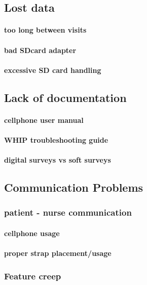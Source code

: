 \subsection {Lost data}
\paragraph {too long between visits}
\paragraph {bad SDcard adapter}
\paragraph{excessive SD card handling}

\subsection{Lack of documentation}
\paragraph{cellphone user manual}
\paragraph{WHIP troubleshooting guide}
\paragraph{ digital surveys vs soft surveys}

\subsection{Communication Problems}

\subsubsection{patient - nurse communication}
\paragraph{cellphone usage}
\paragraph{proper strap placement/usage}

\subsubsection{Feature creep}
